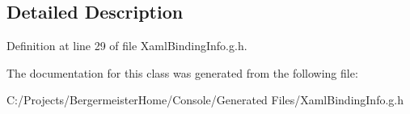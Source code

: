 \subsection{Detailed Description}


Definition at line 29 of file Xaml\+Binding\+Info.\+g.\+h.



The documentation for this class was generated from the following file\+:\begin{DoxyCompactItemize}
\item 
C\+:/\+Projects/\+Bergermeister\+Home/\+Console/\+Generated Files/Xaml\+Binding\+Info.\+g.\+h\end{DoxyCompactItemize}
